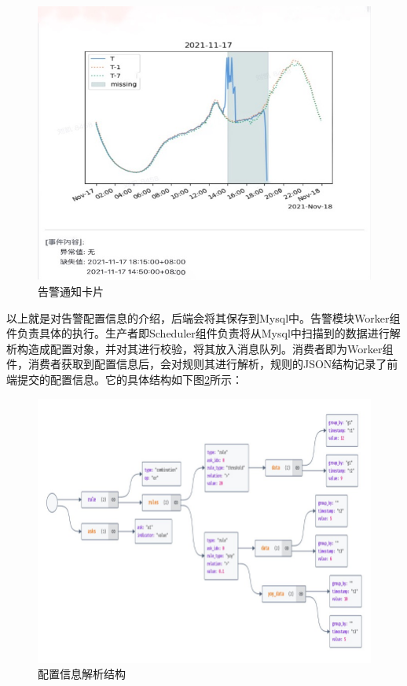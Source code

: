 \begin{figure}[htbp]
  \centering
  \includegraphics[width=5in]{figure/chapter4/告警通知卡片.jpg}
  \caption{告警通知卡片}\label{gaojingkapian}
\end{figure}

以上就是对告警配置信息的介绍，后端会将其保存到Mysql中。告警模块Worker组件负责具体的执行。生产者即Scheduler组件负责将从Mysql中扫描到的数据进行解析构造成配置对象，并对其进行校验，将其放入消息队列。消费者即为Worker组件，消费者获取到配置信息后，会对规则其进行解析，规则的JSON结构记录了前端提交的配置信息。它的具体结构如下图\ref{peizhijiexi}所示：
\begin{figure}[htbp]
  \centering
  \includegraphics[width=5in]{figure/chapter4/配置信息解析结构.jpg}
  \caption{配置信息解析结构}\label{peizhijiexi}
\end{figure}

